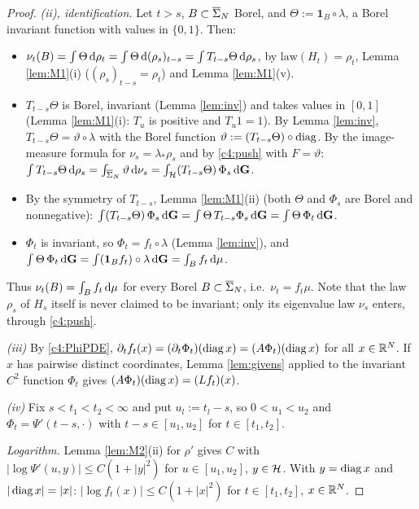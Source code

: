 \begin{proof}
\emph{(ii), identification.} Let $t>s$, $B\subset\overline{\Sigma}_N$ Borel, and $\Theta:=\mathbf 1_B\circ\lambda$, a Borel invariant function with values in $\{0,1\}$. Then:
\begin{itemize}[leftmargin=1.6em,itemsep=1pt]
\item[(a)] $\nu_t(B)=\int\Theta\,\mathrm{d}\rho_t=\int\Theta\,\mathrm{d}(\rho_s)_{t-s}=\int T_{t-s}\Theta\,\mathrm{d}\rho_s$, by $\mathrm{law}(H_t)=\rho_t$, Lemma \ref{lem:M1}(i) ($(\rho_s)_{t-s}=\rho_t$) and Lemma \ref{lem:M1}(v).
\item[(b)] $T_{t-s}\Theta$ is Borel, invariant (Lemma \ref{lem:inv}) and takes values in $[0,1]$ (Lemma \ref{lem:M1}(i): $T_u$ is positive and $T_u1=1$). By Lemma \ref{lem:inv}, $T_{t-s}\Theta=\vartheta\circ\lambda$ with the Borel function $\vartheta:=(T_{t-s}\Theta)\circ\operatorname{diag}$.
By the image-measure formula for $\nu_s=\lambda_*\rho_s$ and by \eqref{c4:push} with $F=\vartheta$:
$\int T_{t-s}\Theta\,\mathrm{d}\rho_s=\int_{\overline{\Sigma}_N}\vartheta\,\mathrm{d}\nu_s=\int_{\mathcal{H}}(T_{t-s}\Theta)\,\Phi_s\,\mathrm{d}\mathbf{G}$.
\item[(c)] By the symmetry of $T_{t-s}$, Lemma \ref{lem:M1}(ii) (both $\Theta$ and $\Phi_s$ are Borel and nonnegative): $\int(T_{t-s}\Theta)\,\Phi_s\,\mathrm{d}\mathbf{G}=\int\Theta\,T_{t-s}\Phi_s\,\mathrm{d}\mathbf{G}=\int\Theta\,\Phi_t\,\mathrm{d}\mathbf{G}$.
\item[(d)] $\Phi_t$ is invariant, so $\Phi_t=f_t\circ\lambda$ (Lemma \ref{lem:inv}), and $\int\Theta\,\Phi_t\,\mathrm{d}\mathbf{G}=\int(\mathbf 1_Bf_t)\circ\lambda\,\mathrm{d}\mathbf{G}=\int_Bf_t\,\mathrm{d}\mu$.
\end{itemize}
Thus $\nu_t(B)=\int_Bf_t\,\mathrm{d}\mu$ for every Borel $B\subset\overline{\Sigma}_N$, i.e.\ $\nu_t=f_t\mu$. Note that the law $\rho_s$ of $H_s$ itself is never claimed to be invariant; only its eigenvalue law $\nu_s$ enters, through \eqref{c4:push}.

\emph{(iii)} By \eqref{c4:PhiPDE}, $\partial_tf_t(x)=(\partial_t\Phi_t)(\operatorname{diag} x)=(A\Phi_t)(\operatorname{diag} x)$ for all $x\in\mathbb{R}^N$. If $x$ has pairwise distinct coordinates, Lemma \ref{lem:givens} applied to the invariant $C^2$ function $\Phi_t$ gives $(A\Phi_t)(\operatorname{diag} x)=(Lf_t)(x)$.

\emph{(iv)} Fix $s<t_1<t_2<\infty$ and put $u_l:=t_l-s$, so $0<u_1<u_2$ and $\Phi_t=\Psi'(t-s,\cdot)$ with $t-s\in[u_1,u_2]$ for $t\in[t_1,t_2]$.

\emph{Logarithm.} Lemma \ref{lem:M2}(ii) for $\rho'$ gives $C$ with $|\log\Psi'(u,y)|\le C(1+|y|^2)$ for $u\in[u_1,u_2]$, $y\in\mathcal{H}$. With $y=\operatorname{diag} x$ and $|\operatorname{diag} x|=|x|$: $|\log f_t(x)|\le C(1+|x|^2)$ for $t\in[t_1,t_2]$, $x\in\mathbb{R}^N$.


\end{proof}

